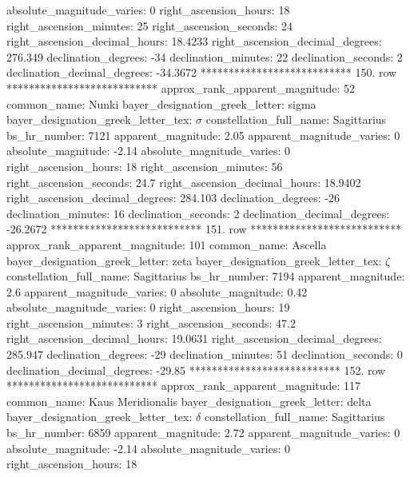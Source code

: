          absolute_magnitude_varies: 0
             right_ascension_hours: 18
           right_ascension_minutes: 25
           right_ascension_seconds: 24
     right_ascension_decimal_hours: 18.4233
   right_ascension_decimal_degrees: 276.349
               declination_degrees: -34
               declination_minutes: 22
               declination_seconds: 2
       declination_decimal_degrees: -34.3672
*************************** 150. row ***************************
    approx_rank_apparent_magnitude: 52
                       common_name: Nunki
    bayer_designation_greek_letter: sigma
bayer_designation_greek_letter_tex: $\sigma$
           constellation_full_name: Sagittarius
                      bs_hr_number: 7121
                apparent_magnitude: 2.05
         apparent_magnitude_varies: 0
                absolute_magnitude: -2.14
         absolute_magnitude_varies: 0
             right_ascension_hours: 18
           right_ascension_minutes: 56
           right_ascension_seconds: 24.7
     right_ascension_decimal_hours: 18.9402
   right_ascension_decimal_degrees: 284.103
               declination_degrees: -26
               declination_minutes: 16
               declination_seconds: 2
       declination_decimal_degrees: -26.2672
*************************** 151. row ***************************
    approx_rank_apparent_magnitude: 101
                       common_name: Ascella
    bayer_designation_greek_letter: zeta
bayer_designation_greek_letter_tex: $\zeta$
           constellation_full_name: Sagittarius
                      bs_hr_number: 7194
                apparent_magnitude: 2.6
         apparent_magnitude_varies: 0
                absolute_magnitude: 0.42
         absolute_magnitude_varies: 0
             right_ascension_hours: 19
           right_ascension_minutes: 3
           right_ascension_seconds: 47.2
     right_ascension_decimal_hours: 19.0631
   right_ascension_decimal_degrees: 285.947
               declination_degrees: -29
               declination_minutes: 51
               declination_seconds: 0
       declination_decimal_degrees: -29.85
*************************** 152. row ***************************
    approx_rank_apparent_magnitude: 117
                       common_name: Kaus Meridionalis
    bayer_designation_greek_letter: delta
bayer_designation_greek_letter_tex: $\delta$
           constellation_full_name: Sagittarius
                      bs_hr_number: 6859
                apparent_magnitude: 2.72
         apparent_magnitude_varies: 0
                absolute_magnitude: -2.14
         absolute_magnitude_varies: 0
             right_ascension_hours: 18
